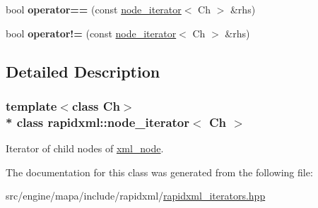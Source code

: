 \begin{DoxyCompactItemize}
\item 
bool {\bfseries operator==} (const \hyperlink{classrapidxml_1_1node__iterator}{node\+\_\+iterator}$<$ Ch $>$ \&rhs)\hypertarget{classrapidxml_1_1node__iterator_a5cb8a3b0d65a1a2517995e986a4debfd}{}\label{classrapidxml_1_1node__iterator_a5cb8a3b0d65a1a2517995e986a4debfd}

\item 
bool {\bfseries operator!=} (const \hyperlink{classrapidxml_1_1node__iterator}{node\+\_\+iterator}$<$ Ch $>$ \&rhs)\hypertarget{classrapidxml_1_1node__iterator_a20f1e25347d7e3856694f18597f7c8e2}{}\label{classrapidxml_1_1node__iterator_a20f1e25347d7e3856694f18597f7c8e2}

\end{DoxyCompactItemize}


\subsection{Detailed Description}
\subsubsection*{template$<$class Ch$>$\\*
class rapidxml\+::node\+\_\+iterator$<$ Ch $>$}

Iterator of child nodes of \hyperlink{classrapidxml_1_1xml__node}{xml\+\_\+node}. 

The documentation for this class was generated from the following file\+:\begin{DoxyCompactItemize}
\item 
src/engine/mapa/include/rapidxml/\hyperlink{rapidxml__iterators_8hpp}{rapidxml\+\_\+iterators.\+hpp}\end{DoxyCompactItemize}
